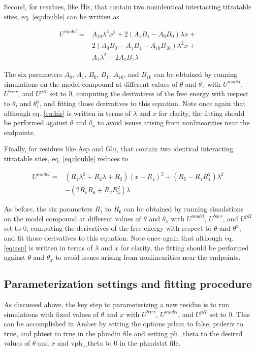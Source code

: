 \documentclass[9pt,tutorial]{livecoms}
\begin{document}
Second, for residues, like His, that contain two nonidentical intertacting titratable sites, eq. \ref{eq:double} can be written as

\begin{align}
U^{model}= & A_{10}\lambda^{2}x^{2}+2\left(A_{1}B_{1}-A_{0}B_{0}\right)\lambda x+\nonumber \\ & 2\left(A_{0}B_{0}-A_{1}B_{1}-A_{10}B_{10}\right)\lambda^{2}x+ \nonumber \\ & A_{1}\lambda^{2}-2A_{1}B_{1}\lambda\label{eq:his}
\end{align}

The six parameters $A_{0}$, $A_{1}$, $B_{0}$, $B_{1}$, $A_{10}$, and $B_{10}$ can be obtained by running simulations on the model compound at different values of $\theta$ and $\theta_{x}$ with $U^{model}$, $U^{barr}$, and $U^{pH}$ set to 0, computing the derivatives of the free energy with respect to $\theta_{i}$ and $\theta^{x}_{i}$, and fitting those derivatives to this equation. Note once again that although eq. \ref{eq:his} is written in terms of $\lambda$ and $x$ for clarity, the fitting should be performed against $\theta$ and $\theta_{x}$ to avoid issues arising from nonlinearities near the endpoints.

Finally, for residues like Asp and Glu, that contain two identical interacting titratable sites, eq. \ref{eq:double} reduces to

\begin{align}
    U^{model}= & \left(R_{1}\lambda^{2}+R_{2}\lambda+R_{3}\right)\left(x-R_{4}\right)^{2}+\left(R_{5}-R_{1}R_{4}^{2}\right)\lambda^{2} \nonumber\\ & -\left(2R_{5}R_{6}+R_{2}R_{4}^{2}\right)\lambda \label{eq:asp}
\end{align}

As before, the six parameters $R_{1}$ to $R_{6}$ can be obtained by running simulations on the model compound at different values of $\theta$ and $\theta_{x}$ with $U^{model}$, $U^{barr}$, and $U^{pH}$ set to 0, computing the derivatives of the free energy with respect to $\theta$ and $\theta^{x}$, and fit those derivatives to this equation. Note once again that although eq. \ref{eq:asp} is written in terms of $\lambda$ and $x$ for clarity, the fitting should be performed against $\theta$ and $\theta_{x}$ to avoid issues arising from nonlinearities near the endpoints.

\subsection{Parameterization settings and fitting procedure}
As discussed above, the key step to parameterizing a new residue is to run simulations with fixed values of $\theta$ and $x$ with $U^{barr}$, $U^{model}$, and $U^{pH}$ set to 0. This can be accomplished in Amber by setting the options prlam to false, prderiv to true, and phtest to true in the phmdin file and setting ph{\_}theta to the desired values of $\theta$ and $x$ and vph{\_}theta to 0 in the phmdstrt file.
\end{document}
